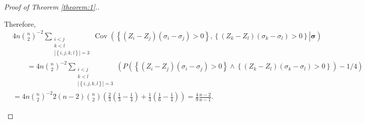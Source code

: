 \documentclass[12pt]{article}
\renewcommand{\P}{P}
\newcommand{\z}{Z}
\DeclareMathOperator{\Cov}{Cov}
\begin{document}
\begin{proof}[Proof of Theorem \ref{theorem:1}.]
\begin{enumerate}[wide, labelwidth=!, labelindent=0pt]
\begin{enumerate}[wide, labelwidth=!, labelindent=0pt]
  Therefore,
  \begin{align}
    &4n{n\choose 2}^{-2}\sum_{\substack{i<j\\k<l\\|\left\{i,j,k,l\right\}|=3}}\Cov\left(\left.
    \left\{\left(\z_i-\z_j\right)(\sigma_i-\sigma_j)>0\right\},
    \left\{\left(\z_k-\z_l\right)(\sigma_k-\sigma_l)>0\right\}
    \right|\pmb{\sigma}\right) \\
    &\qquad=4n{n\choose 2}^{-2}\sum_{\substack{i<j\\k<l\\|\left\{i,j,k,l\right\}|=3}}\left(\P\left(
        \left\{\left(\z_i-\z_j\right)(\sigma_i-\sigma_j)>0\right\}\wedge
    \left\{\left(\z_k-\z_l\right)(\sigma_k-\sigma_l)>0\right\}
    \right)-1/4\right)\\
    &= 4n{n\choose 2}^{-2}2(n-2){n\choose 2}\left(\frac{2}{3}\left(\frac{1}{3}-\frac{1}{4}\right) + \frac{1}{3}\left(\frac{1}{6}-\frac{1}{4}\right)\right)=\frac{4}{9}\frac{n-2}{n-1}.
  \end{align}

\end{enumerate}


\end{enumerate}
\end{proof}
\end{document}
